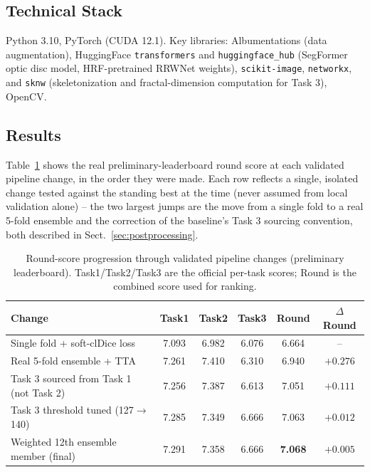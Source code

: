 \documentclass[runningheads]{llncs}
\begin{document}
\subsection{Technical Stack}
Python 3.10, PyTorch (CUDA 12.1). Key libraries: Albumentations (data
augmentation), HuggingFace \texttt{transformers} and \texttt{huggingface\_hub}
(SegFormer optic disc model, HRF-pretrained RRWNet weights),
\texttt{scikit-image}, \texttt{networkx}, and \texttt{sknw} (skeletonization
and fractal-dimension computation for Task 3), OpenCV.

\subsection{Results}\label{sec:results}
Table~\ref{tab:progression} shows the real preliminary-leaderboard round
score at each validated pipeline change, in the order they were made. Each
row reflects a single, isolated change tested against the standing best at
the time (never assumed from local validation alone) -- the two largest
jumps are the move from a single fold to a real 5-fold ensemble and the
correction of the baseline's Task 3 sourcing convention, both described in
Sect.~\ref{sec:postprocessing}.

\begin{table}[t]
\centering
\caption{Round-score progression through validated pipeline changes
(preliminary leaderboard). Task1/Task2/Task3 are the official per-task
scores; Round is the combined score used for ranking.}
\label{tab:progression}
\begin{tabular}{lccccc}
\toprule
Change & Task1 & Task2 & Task3 & Round & $\Delta$Round \\
\midrule
Single fold + soft-clDice loss & 7.093 & 6.982 & 6.076 & 6.664 & -- \\
Real 5-fold ensemble + TTA & 7.261 & 7.410 & 6.310 & 6.940 & $+0.276$ \\
Task 3 sourced from Task 1 (not Task 2) & 7.256 & 7.387 & 6.613 & 7.051 & $+0.111$ \\
Task 3 threshold tuned (127$\to$140) & 7.285 & 7.349 & 6.666 & 7.063 & $+0.012$ \\
Weighted 12th ensemble member (final) & 7.291 & 7.358 & 6.666 & \textbf{7.068} & $+0.005$ \\
\bottomrule
\end{tabular}
\end{table}
\end{document}
